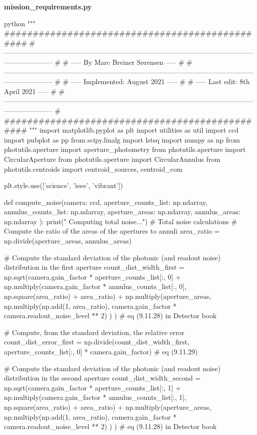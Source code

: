 \documentclass[../main.tex]{subfiles}
\begin{document}
\clearpage
\textbf{mission\_requirements.py}
\begin{mintedbox}{python}
"""
###############################################
# --------------------------------------------------------------------------------------------------------------------------------- #
# -----       By Marc Breiner Sørensen        ----- #
# --------------------------------------------------------------------------------------------------------------------------------- #
# ----- Implemented:           August    2021 ----- #
# ----- Last edit:       8th   April     2021 ----- #
# --------------------------------------------------------------------------------------------------------------------------------- #
###############################################
"""
import matplotlib.pyplot as plt
import utilities as util
import ccd
import pubplot as pp
from scipy.linalg import lstsq
import numpy as np
from photutils.aperture import aperture_photometry
from photutils.aperture import CircularAperture
from photutils.aperture import CircularAnnulus
from photutils.centroids import centroid_sources, centroid_com

plt.style.use(['science', 'ieee', 'vibrant'])


def compute_noise(camera: ccd,
aperture_counts_list: np.ndarray,
annulus_counts_list: np.ndarray,
aperture_areas: np.ndarray,
annulus_areas: np.ndarray
):
print("  Computing total noise...")
# Total noise calculations
# Compute the ratio of the areas of the apertures to annuli
area_ratio  =  np.divide(aperture_areas, annulus_areas)

# Compute the standard deviation of the photonic (and readout noise) distribution in the first aperture
count_dist_width_first  =  np.sqrt(camera.gain_factor * aperture_counts_list[:, 0]
+ np.multiply(camera.gain_factor * annulus_counts_list[:, 0],
np.square(area_ratio) + area_ratio)
+ np.multiply(aperture_areas,
np.multiply(np.add(1, area_ratio),
camera.gain_factor * camera.readout_noise_level ** 2)
)
)  # eq (9.11.28) in Detector book

# Compute, from the standard deviation, the relative error
count_dist_error_first  =  np.divide(count_dist_width_first,
aperture_counts_list[:, 0] * camera.gain_factor)  # eq (9.11.29)

# Compute the standard deviation of the photonic (and readout noise) distribution in the second aperture
count_dist_width_second  =  np.sqrt(camera.gain_factor * aperture_counts_list[:, 1]
+ np.multiply(camera.gain_factor * annulus_counts_list[:, 1],
np.square(area_ratio) + area_ratio)
+ np.multiply(aperture_areas,
np.multiply(np.add(1, area_ratio),
camera.gain_factor * camera.readout_noise_level ** 2)
)
)  # eq (9.11.28) in Detector book


\end{mintedbox}
\end{document}
